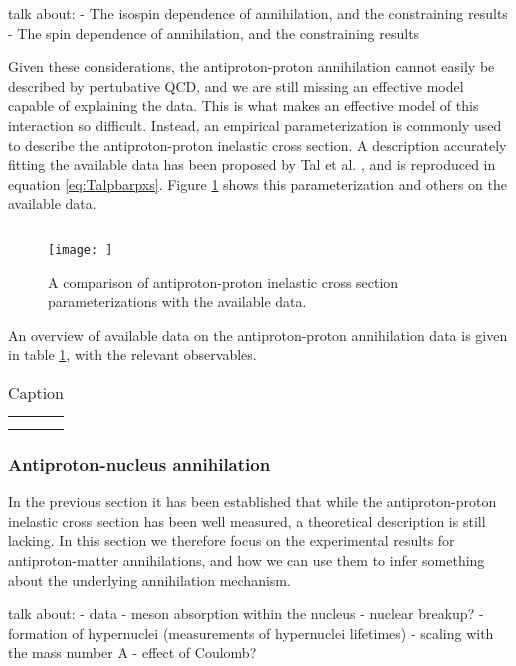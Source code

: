 talk about:
- The isospin dependence of annihilation, and the constraining results
- The spin dependence of annihilation, and the constraining results

Given these considerations, the antiproton-proton annihilation cannot easily be described by pertubative QCD, and we are still missing an effective model capable of explaining the data. This is what makes an effective model of this interaction so difficult. Instead, an empirical parameterization is commonly used to describe the antiproton-proton inelastic cross section. A description accurately fitting the available data has been proposed by Tal et al. \cite{}, and is reproduced in equation \ref{eq:Talpbarpxs}. Figure \ref{fig:pbar_p_xs_data_comp} shows this parameterization and others on the available data.  

\begin{equation}\label{eq:Talpbarpxs}
    
\end{equation}

\begin{figure}
    \centering
    \texttt{[image: ]}
    \caption{A comparison of antiproton-proton inelastic cross section parameterizations with the available data.}
    \label{fig:pbar_p_xs_data_comp}
\end{figure}
An overview of available data on the antiproton-proton annihilation data is given in table \ref{tab:pbarp_ann_data}, with the relevant observables. 

\begin{table}[]
    \centering
    \begin{tabular}{|c|c|c|}
         &  \\
         & 
    \end{tabular}
    \caption{Caption}
    \label{tab:pbarp_ann_data}
\end{table}

\subsubsection{Antiproton-nucleus annihilation}
In the previous section it has been established that while the antiproton-proton inelastic cross section has been well measured, a theoretical description is still lacking. In this section we therefore focus on the experimental results for antiproton-matter annihilations, and how we can use them to infer something about the underlying annihilation mechanism. 

talk about:
- data
- meson absorption within the nucleus
- nuclear breakup?
- formation of hypernuclei (measurements of hypernuclei lifetimes)
- scaling with the mass number A
- effect of Coulomb?
